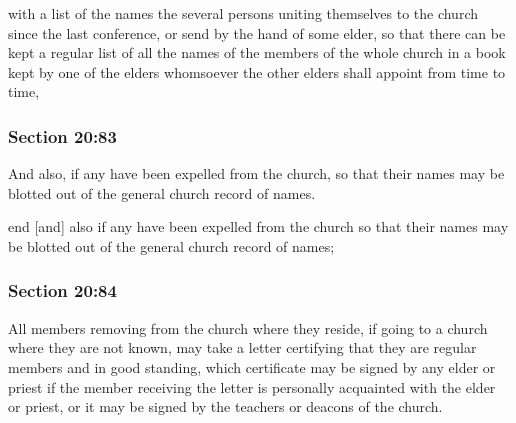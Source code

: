 		\begin{framed}
		\scriptsize
			\begin{compactdesc}
				\item[JSP] with a list of the names the several persons uniting themselves to the church since the last conference, or send by the hand of some elder, so that there can be kept a regular list of all the names of the members of the whole church in a book kept by one of the elders whomsoever the other elders shall appoint from time to time, 
				\item[RB1] 
				\item[BC] 
			\end{compactdesc}
		\end{framed}

	\subsubsection{Section 20:83} %
		\label{DC20-83}

		And also, if any have been expelled from the church, so that their names may be blotted out of the general church record of names.

		\begin{framed}
		\scriptsize
			\begin{compactdesc}
				\item[JSP] end [and] also if any have been expelled from the church so that their names may be blotted out of the general church record of names; 
				\item[RB1] 
				\item[BC] 
			\end{compactdesc}
		\end{framed}

	\subsubsection{Section 20:84} %
		\label{DC20-84}

		All members removing from the church where they reside, if going to a church where they are not known, may take a letter certifying that they are regular members and in good standing, which certificate may be signed by any elder or priest if the member receiving the letter is personally acquainted with the elder or priest, or it may be signed by the teachers or deacons of the church.

